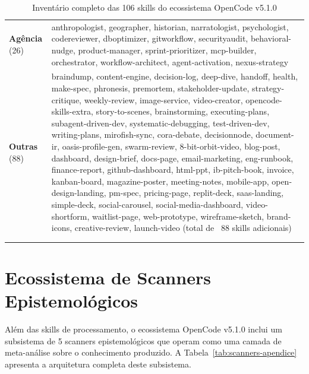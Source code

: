 \begin{longtable}{p{4cm}p{11cm}}
\textbf{Agência} (26) & 
anthropologist, geographer, historian, narratologist, psychologist, codereviewer, dboptimizer, gitworkflow, securityaudit, behavioral-nudge, product-manager, sprint-prioritizer, mcp-builder, orchestrator, workflow-architect, agent-activation, nexus-strategy \\
\addlinespace

\textbf{Outras} (88) & 
braindump, content-engine, decision-log, deep-dive, handoff, health, make-spec, phronesis, premortem, stakeholder-update, strategy-critique, weekly-review, image-service, video-creator, opencode-skills-extra, story-to-scenes, brainstorming, executing-plans, subagent-driven-dev, systematic-debugging, test-driven-dev, writing-plans, mirofish-sync, cora-debate, decisionnode, document-ir, oasis-profile-gen, swarm-review, 8-bit-orbit-video, blog-post, dashboard, design-brief, docs-page, email-marketing, eng-runbook, finance-report, github-dashboard, html-ppt, ib-pitch-book, invoice, kanban-board, magazine-poster, meeting-notes, mobile-app, open-design-landing, pm-spec, pricing-page, replit-deck, saas-landing, simple-deck, social-carousel, social-media-dashboard, video-shortform, waitlist-page, web-prototype, wireframe-sketch, brand-icons, creative-review, launch-video (total de ~88 skills adicionais) \\
\bottomrule
\caption{Inventário completo das 106 skills do ecossistema OpenCode v5.1.0}\\
\label{tab:skills-inventory}
\end{longtable}

\section{Ecossistema de Scanners Epistemológicos}

Além das skills de processamento, o ecossistema OpenCode v5.1.0 inclui um subsistema de 5 scanners epistemológicos que operam como uma camada de meta-análise sobre o conhecimento produzido. A Tabela~\ref{tab:scanners-apendice} apresenta a arquitetura completa deste subsistema.

